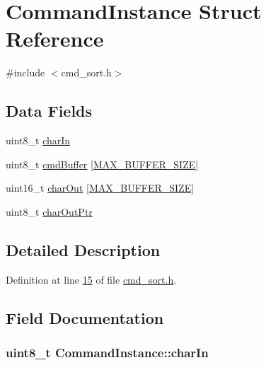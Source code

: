 \hypertarget{struct_command_instance}{\section{Command\-Instance Struct Reference}
\label{struct_command_instance}
}


{\ttfamily \#include $<$cmd\-\_\-sort.\-h$>$}

\subsection*{Data Fields}
\begin{DoxyCompactItemize}
\item 
uint8\-\_\-t \hyperlink{struct_command_instance_a34f2e2824ae663982ef5d8a9ae4dbd76}{char\-In}
\item 
uint8\-\_\-t \hyperlink{struct_command_instance_a8b8b51e6eacf265b2fb0c83dc8fc8823}{cmd\-Buffer} \mbox{[}\hyperlink{cmd__sort_8h_ad4d796b98c583d49e83adabd74a63bf6}{M\-A\-X\-\_\-\-B\-U\-F\-F\-E\-R\-\_\-\-S\-I\-Z\-E}\mbox{]}
\item 
uint16\-\_\-t \hyperlink{struct_command_instance_af1524bd8db77ca27b543a3c2a1a5638f}{char\-Out} \mbox{[}\hyperlink{cmd__sort_8h_ad4d796b98c583d49e83adabd74a63bf6}{M\-A\-X\-\_\-\-B\-U\-F\-F\-E\-R\-\_\-\-S\-I\-Z\-E}\mbox{]}
\item 
uint8\-\_\-t \hyperlink{struct_command_instance_a4817d15d26b34d5b4ae000d12e4d73ac}{char\-Out\-Ptr}
\end{DoxyCompactItemize}


\subsection{Detailed Description}


Definition at line \hyperlink{cmd__sort_8h_source_l00015}{15} of file \hyperlink{cmd__sort_8h_source}{cmd\-\_\-sort.\-h}.



\subsection{Field Documentation}
\hypertarget{struct_command_instance_a34f2e2824ae663982ef5d8a9ae4dbd76}{
\subsubsection[{char\-In}]{\setlength{\rightskip}{0pt plus 5cm}uint8\-\_\-t Command\-Instance\-::char\-In}}\label{struct_command_instance_a34f2e2824ae663982ef5d8a9ae4dbd76}


